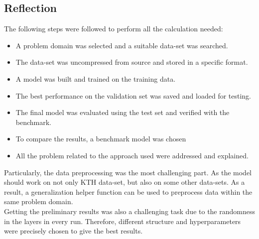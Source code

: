 \subsection{Reflection}
\hspace{5mm} The following steps were followed to perform all the calculation needed:\\
\begin{itemize}
    \item A problem domain was selected and a suitable data-set was searched.
    \item The data-set was uncompressed from source and stored in a specific format.
    \item A model was built and trained on the training data. 
    \item The best performance on the validation set was saved and loaded for testing.
    \item The final model was evaluated using the test set and verified with the benchmark.
    \item To compare the results, a benchmark model was chosen
    \item All the problem related to the approach used were addressed and explained.
    
\end{itemize}
\hspace{5mm} Particularly, the data preprocessing was the most challenging part. As the model should work on not only KTH data-set, but also on some other data-sets. As a result, a generalization helper function can be used to preprocess data within the same problem domain.\\

Getting the preliminary results was also a challenging task due to the randomness in the layers in every run. Therefore, different structure and hyperparameters were precisely chosen to give the best results.

